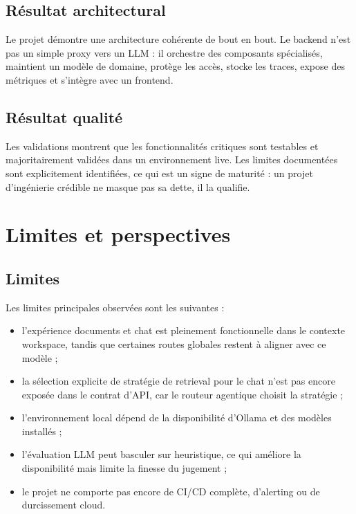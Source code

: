 \documentclass[12pt,a4paper,oneside]{report}
\begin{document}
\section{Résultat architectural}
Le projet démontre une architecture cohérente de bout en bout. Le backend n'est pas un simple proxy vers un LLM : il orchestre des composants spécialisés, maintient un modèle de domaine, protège les accès, stocke les traces, expose des métriques et s'intègre avec un frontend.

\section{Résultat qualité}
Les validations montrent que les fonctionnalités critiques sont testables et majoritairement validées dans un environnement live. Les limites documentées sont explicitement identifiées, ce qui est un signe de maturité : un projet d'ingénierie crédible ne masque pas sa dette, il la qualifie.

\chapter{Limites et perspectives}

\section{Limites}
Les limites principales observées sont les suivantes :
\begin{itemize}
  \item l'expérience documents et chat est pleinement fonctionnelle dans le contexte workspace, tandis que certaines routes globales restent à aligner avec ce modèle ;
  \item la sélection explicite de stratégie de retrieval pour le chat n'est pas encore exposée dans le contrat d'API, car le routeur agentique choisit la stratégie ;
  \item l'environnement local dépend de la disponibilité d'Ollama et des modèles installés ;
  \item l'évaluation LLM peut basculer sur heuristique, ce qui améliore la disponibilité mais limite la finesse du jugement ;
  \item le projet ne comporte pas encore de CI/CD complète, d'alerting ou de durcissement cloud.
\end{itemize}
\end{document}
